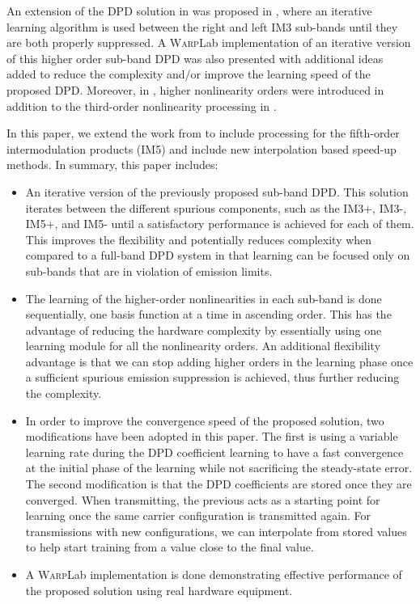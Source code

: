 An extension of the DPD solution in \cite{ICASSP2014,Asilomar2015} was proposed in \cite{Tarver16}, where an iterative learning algorithm is used between the right and left IM3 sub-bands until they are both properly suppressed. 
A \textsc{Warp}Lab implementation of an iterative version of this higher order sub-band DPD was also presented  with additional ideas added to reduce the complexity and/or improve the learning speed of the proposed DPD. 
Moreover, in \cite{TMTT_SubbandDPD}, higher nonlinearity orders were introduced in addition to the third-order nonlinearity processing in \cite{ICASSP2014,Asilomar2015}. 

In this paper, we extend the work from \cite{Tarver16} to include processing for the fifth-order intermodulation products (IM5) and include new interpolation based speed-up methods. In summary, this paper includes:
\begin{itemize}
	\item An iterative version of the previously proposed sub-band DPD. This solution iterates between the different spurious components, such as the IM3+, IM3-, IM5+, and IM5- until a satisfactory performance is achieved for each of them. This improves the flexibility and potentially reduces complexity when compared to a full-band DPD system in that learning can be focused only on sub-bands that are in violation of emission limits. 
	\item The learning of the higher-order nonlinearities in each sub-band is done sequentially, one basis function at a time in ascending order. 
	This has the advantage of reducing the hardware complexity by essentially using one learning module for all the nonlinearity orders. 
	An additional flexibility advantage is that we can stop adding higher orders in the learning phase once a sufficient spurious emission suppression is achieved, thus further reducing the complexity.
	\item In order to improve the convergence speed of the proposed solution, two modifications have been adopted in this paper. 
	The first is using a variable learning rate during the DPD coefficient learning to have a fast convergence at the initial phase of the learning while not sacrificing the steady-state error. 
	The second modification is that the DPD coefficients are stored once they are converged. When transmitting, the previous acts as a starting point for learning once the same carrier configuration is transmitted again. For transmissions with new configurations, we can interpolate from stored values to help start training from a value close to the final value. 
	\item A \textsc{Warp}Lab implementation is done demonstrating effective performance of the proposed solution using real hardware equipment. 
\end{itemize}

